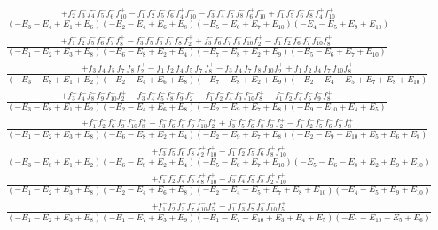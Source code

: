 \documentclass{article}
\begin{document}
\[\begin{array}{rcl}
\frac{+f_{2}^{-}f_{3}^{-}f_{4}^{-}f_{5}^{-}f_{6}^{+}f_{10}^{+}-f_{1}^{-}f_{2}^{-}f_{5}^{-}f_{6}^{-}f_{4}^{+}f_{10}^{+}-f_{3}^{-}f_{4}^{-}f_{5}^{-}f_{8}^{-}f_{6}^{+}f_{10}^{+}+f_{1}^{-}f_{5}^{-}f_{6}^{-}f_{8}^{-}f_{4}^{+}f_{10}^{+}}{(-E_{3}-E_{4}+E_{1}+E_{6})(-E_{2}-E_{4}+E_{6}+E_{8})(-E_{5}-E_{6}+E_{7}+E_{10})(-E_{4}-E_{5}+E_{9}+E_{10})}\\
\frac{+f_{1}^{-}f_{2}^{-}f_{5}^{-}f_{6}^{-}f_{7}^{-}f_{8}^{+}-f_{3}^{-}f_{5}^{-}f_{6}^{-}f_{7}^{-}f_{8}^{-}f_{2}^{+}+f_{3}^{-}f_{6}^{-}f_{7}^{-}f_{8}^{-}f_{10}^{-}f_{2}^{+}-f_{1}^{-}f_{2}^{-}f_{6}^{-}f_{7}^{-}f_{10}^{-}f_{8}^{+}}{(-E_{1}-E_{2}+E_{3}+E_{8})(-E_{6}-E_{8}+E_{2}+E_{4})(-E_{7}-E_{8}+E_{2}+E_{9})(-E_{5}-E_{6}+E_{7}+E_{10})}\\
\frac{+f_{3}^{-}f_{4}^{-}f_{5}^{-}f_{7}^{-}f_{8}^{-}f_{2}^{+}-f_{1}^{-}f_{2}^{-}f_{4}^{-}f_{5}^{-}f_{7}^{-}f_{8}^{+}-f_{3}^{-}f_{4}^{-}f_{7}^{-}f_{8}^{-}f_{10}^{-}f_{2}^{+}+f_{1}^{-}f_{2}^{-}f_{4}^{-}f_{7}^{-}f_{10}^{-}f_{8}^{+}}{(-E_{3}-E_{8}+E_{1}+E_{2})(-E_{2}-E_{4}+E_{6}+E_{8})(-E_{7}-E_{8}+E_{2}+E_{9})(-E_{2}-E_{4}-E_{5}+E_{7}+E_{8}+E_{10})}\\
\frac{+f_{3}^{-}f_{4}^{-}f_{8}^{-}f_{9}^{-}f_{10}^{-}f_{2}^{+}-f_{3}^{-}f_{4}^{-}f_{5}^{-}f_{8}^{-}f_{9}^{-}f_{2}^{+}-f_{1}^{-}f_{2}^{-}f_{4}^{-}f_{9}^{-}f_{10}^{-}f_{8}^{+}+f_{1}^{-}f_{2}^{-}f_{4}^{-}f_{5}^{-}f_{9}^{-}f_{8}^{+}}{(-E_{3}-E_{8}+E_{1}+E_{2})(-E_{2}-E_{4}+E_{6}+E_{8})(-E_{2}-E_{9}+E_{7}+E_{8})(-E_{9}-E_{10}+E_{4}+E_{5})}\\
\frac{+f_{1}^{-}f_{2}^{-}f_{6}^{-}f_{9}^{-}f_{10}^{-}f_{8}^{+}-f_{3}^{-}f_{6}^{-}f_{8}^{-}f_{9}^{-}f_{10}^{-}f_{2}^{+}+f_{3}^{-}f_{5}^{-}f_{6}^{-}f_{8}^{-}f_{9}^{-}f_{2}^{+}-f_{1}^{-}f_{2}^{-}f_{5}^{-}f_{6}^{-}f_{9}^{-}f_{8}^{+}}{(-E_{1}-E_{2}+E_{3}+E_{8})(-E_{6}-E_{8}+E_{2}+E_{4})(-E_{2}-E_{9}+E_{7}+E_{8})(-E_{2}-E_{9}-E_{10}+E_{5}+E_{6}+E_{8})}\\
\frac{+f_{3}^{-}f_{5}^{-}f_{6}^{-}f_{8}^{-}f_{2}^{+}f_{10}^{+}-f_{1}^{-}f_{2}^{-}f_{5}^{-}f_{6}^{-}f_{8}^{+}f_{10}^{+}}{(-E_{3}-E_{8}+E_{1}+E_{2})(-E_{6}-E_{8}+E_{2}+E_{4})(-E_{5}-E_{6}+E_{7}+E_{10})(-E_{5}-E_{6}-E_{8}+E_{2}+E_{9}+E_{10})}\\
\frac{+f_{1}^{-}f_{2}^{-}f_{4}^{-}f_{5}^{-}f_{8}^{+}f_{10}^{+}-f_{3}^{-}f_{4}^{-}f_{5}^{-}f_{8}^{-}f_{2}^{+}f_{10}^{+}}{(-E_{1}-E_{2}+E_{3}+E_{8})(-E_{2}-E_{4}+E_{6}+E_{8})(-E_{2}-E_{4}-E_{5}+E_{7}+E_{8}+E_{10})(-E_{4}-E_{5}+E_{9}+E_{10})}\\
\frac{+f_{1}^{-}f_{2}^{-}f_{3}^{-}f_{7}^{-}f_{10}^{-}f_{5}^{+}-f_{1}^{-}f_{3}^{-}f_{7}^{-}f_{8}^{-}f_{10}^{-}f_{5}^{+}}{(-E_{1}-E_{2}+E_{3}+E_{8})(-E_{1}-E_{7}+E_{3}+E_{9})(-E_{1}-E_{7}-E_{10}+E_{3}+E_{4}+E_{5})(-E_{7}-E_{10}+E_{5}+E_{6})}\\

\end{array}\]
\end{document}

